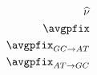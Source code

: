 \documentclass{article}
\begin{document}
\begin{align}
	\widehat{\nu} \\
	\avgpfix \\
	\avgpfix_{GC \rightarrow AT} \\
	\avgpfix_{AT \rightarrow GC}
\end{align}
\end{document}
